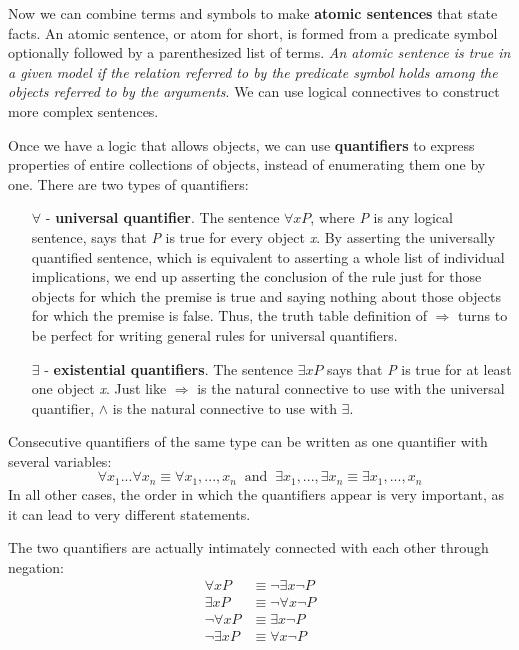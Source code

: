 \documentclass{article}
\begin{document}
Now we can combine terms and symbols to make \textbf{atomic sentences} that state facts. An atomic sentence, or atom for short, is formed from a predicate symbol optionally followed by a parenthesized list of terms. \textit{An atomic sentence is true in a given model if the relation referred to by the predicate symbol holds among the objects referred to by the arguments}. We can use logical connectives to construct more complex sentences.

Once we have a logic that allows objects, we can use \textbf{quantifiers} to express properties of entire collections of objects, instead of enumerating them one by one. There are two types of quantifiers:
\begin{itemize}
    \item [$\forall$] - \textbf{universal quantifier}. The sentence $\forall x P$, where \textit{P} is any logical sentence, says that \textit{P} is true for every object \textit{x}. By asserting the universally quantified sentence, which is equivalent to asserting a whole list of individual implications, we end up asserting the conclusion of the rule just for those objects for which the premise is true and saying nothing about those objects for which the premise is false. Thus, the truth table definition of $\Rightarrow$ turns to be perfect for writing general rules for universal quantifiers.
    \item [$\exists$] - \textbf{existential quantifiers}. The sentence $\exists x P$ says that \textit{P} is true for at least one object \textit{x}. Just like $\Rightarrow$ is the natural connective to use with the universal quantifier, $\land$ is the natural connective to use with $\exists$.
\end{itemize}

Consecutive quantifiers of the same type can be written as one quantifier with several variables:
$$\forall x_1 ... \forall x_n \equiv \forall x_1,...,x_n \;\;\text{and}\;\; \exists x_1, ..., \exists x_n \equiv \exists x_1,...,x_n$$
In all other cases, the order in which the quantifiers appear is very important, as it can lead to very different statements.

The two quantifiers are actually intimately connected with each other through negation:
\begin{align*}
    \forall x P & \equiv \neg\exists x \neg P \\
    \exists x P & \equiv \neg\forall x \neg P \\
    \neg\forall x P & \equiv \exists x \neg P \\
    \neg\exists x P & \equiv \forall x \neg P \\
\end{align*}
\end{document}
